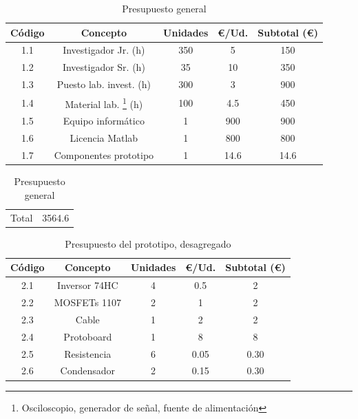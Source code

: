 \documentclass[12pt]{report} %
\begin{document}
	\begin{table}[H]
		\begin{tabular}{|c|c|c|c|c|}
			Código & Concepto & Unidades & €/Ud. & Subtotal (€) \\
			\hline
			1.1 & Investigador Jr. (h) & 350 & 5 & 150 \\
			1.2 & Investigador Sr. (h) & 35 & 10 & 350 \\
			1.3 & Puesto lab. invest. (h) & 300 & 3 & 900 \\
			1.4 & Material lab. \footnote{Osciloscopio, generador de señal, fuente de alimentación}  (h) & 100 &
			 4.5 & 450 \\
			1.5 & Equipo informático & 1 & 900 & 900 \\
			1.6 & Licencia Matlab & 1 & 800 & 800 \\
			1.7 & Componentes prototipo & 1 & 14.6 & 14.6 \\
		\end{tabular}
		\begin{tabular}{lr}
			Total & 3564.6
		\end{tabular}
	\caption{Presupuesto general}
	\end{table}

	\begin{table}[H]
		\begin{tabular}{|c|c|c|c|c|}
			Código & Concepto & Unidades & €/Ud. & Subtotal (€) \\
			\hline
			2.1 & Inversor 74HC & 4 & 0.5 & 2 \\
			2.2 & MOSFETs 1107 & 2 & 1 & 2 \\
			2.3 & Cable & 1 & 2 & 2 \\
			2.4 & Protoboard & 1 & 8 & 8 \\
			2.5 & Resistencia & 6 & 0.05 & 0.30 \\
			2.6 & Condensador & 2 & 0.15 & 0.30 \\
		\end{tabular}
		\caption{Presupuesto del prototipo, desagregado}
	\end{table}

\nocite{*} %

\clearpage


\printbibliography


\end{document}
